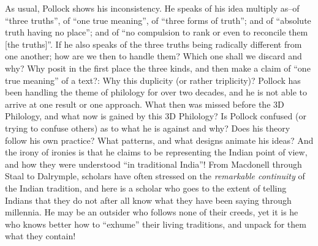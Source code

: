 As usual, Pollock shows his inconsistency. He speaks of his idea multiply as–of “three truths”, of “one true meaning”, of “three forms of truth”; and of “absolute truth having no place”; and of “no compulsion to rank or even to reconcile them [the truths]”. If he also speaks of the three truths being radically different from one another; how are we then to handle them? Which one shall we discard and why? Why posit in the first place the three kinds, and then make a claim of “one true meaning” of a text?: Why this duplicity (or rather triplicity)? Pollock has been handling the theme of philology for over two decades, and he is not able to arrive at one result or one approach. What then was missed before the 3D Philology, and what now is gained by this 3D Philology? Is Pollock confused (or trying to confuse others) as to what he is against and why? Does his theory follow his own practice? What patterns, and what designs animate his ideas? And the irony of ironies is that he claims to be representing the Indian point of view, and how they were understood “in traditional India”! From Macdonell through Staal to Dalrymple, scholars have often stressed on the \textit{remarkable continuity} of the Indian tradition, and here is a scholar who goes to the extent of telling Indians that they do not after all know what they have been saying through millennia. He may be an outsider who follows none of their creeds, yet it is he who knows better how to “exhume” their living traditions, and unpack for them what they contain!

